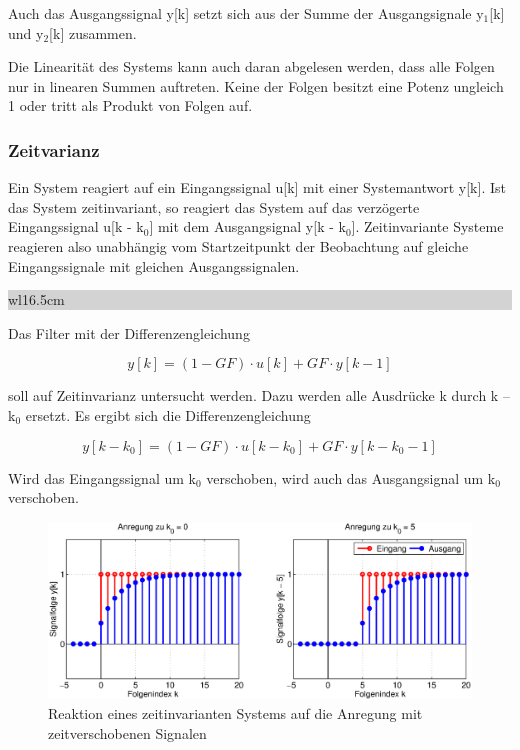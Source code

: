 \noindent Auch das Ausgangssignal y[k] setzt sich aus der Summe der Ausgangsignale y${}_{1}$[k] und y${}_{2}$[k] zusammen.\bigskip

\noindent Die Linearit\"{a}t des Systems kann auch daran abgelesen werden, dass alle Folgen nur in linearen Summen auftreten. Keine der Folgen besitzt eine Potenz ungleich 1 oder tritt als Produkt von Folgen auf. 

\subsubsection{Zeitvarianz}

\noindent Ein System reagiert auf ein Eingangssignal u[k] mit einer Systemantwort y[k]. Ist das System zeitinvariant, so reagiert das System auf das verz\"{o}gerte Eingangssignal u[k - k${}_{0}$] mit dem Ausgangsignal y[k - k${}_{0}$]. Zeitinvariante Systeme reagieren also unabh\"{a}ngig vom Startzeitpunkt der Beobachtung auf gleiche Eingangssignale mit gleichen Ausgangssignalen.\bigskip

\noindent
\colorbox{lightgray}{%
%
\renewcommand\arraystretch{0.6}%
\begin{tabular}{ wl{16.5cm} }
{}
\end{tabular}%
}\medskip

\noindent Das Filter mit der Differenzengleichung 

\begin{equation}\label{eq:fourtwentysix}
y\left[k\right]=\left(1-GF\right)\cdot u\left[k\right]+GF\cdot y\left[k-1\right]
\end{equation}

\noindent soll auf Zeitinvarianz untersucht werden. Dazu werden alle Ausdr\"{u}cke k durch k -- k${}_{0}$ ersetzt. Es ergibt sich die Differenzengleichung

\begin{equation}\label{eq:fourtwentyseven}
y\left[k-k_{0} \right]=\left(1-GF\right)\cdot u\left[k-k_{0} \right]+GF\cdot y\left[k-k_{0} -1\right]
\end{equation}

\noindent Wird das Eingangssignal um k${}_{0}$ verschoben, wird auch das Ausgangsignal um k${}_{0}$ verschoben.

\begin{figure}[H]
  \centerline{\includegraphics[width=1\textwidth]{Kapitel4/Bilder/image8.eps}}
  \caption{Reaktion eines zeitinvarianten Systems auf die Anregung mit zeitverschobenen Signalen}
  \label{fig:RekursivTiefpassZeitinvarianz}
\end{figure}


